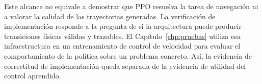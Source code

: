 Este alcance no equivale a demostrar que PPO resuelva la tarea de navegación ni
a valorar la calidad de las trayectorias generadas. La verificación de
implementación responde a la pregunta de si la arquitectura puede producir
transiciones físicas válidas y trazables. El Capítulo~\ref{chp:pruebas} utiliza
esa infraestructura en un entrenamiento de control de velocidad para evaluar el
comportamiento de la política sobre un problema concreto. Así, la evidencia de
correctitud de implementación queda separada de la evidencia de utilidad del
control aprendido.
